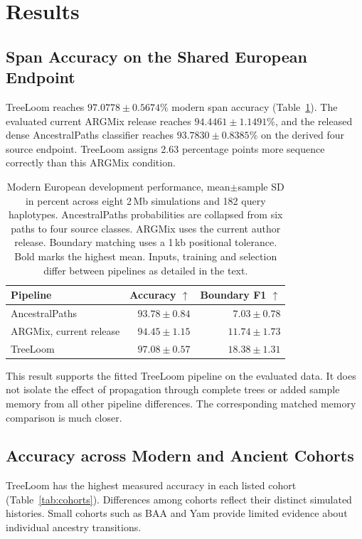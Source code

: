 \documentclass[letterpaper]{article}
\newcommand{\best}[1]{\mathbf{#1}}
\begin{document}
\section{Results}
\subsection{Span Accuracy on the Shared European Endpoint}
TreeLoom reaches $97.0778\pm0.5674\%$ modern span accuracy (Table~\ref{tab:pipeline}). The evaluated current ARGMix release reaches $94.4461\pm1.1491\%$, and the released dense AncestralPaths classifier reaches $93.7830\pm0.8385\%$ on the derived four source endpoint. TreeLoom assigns 2.63 percentage points more sequence correctly than this ARGMix condition.

\begin{table}[t]
\centering
\small
\begin{tabular}{@{}lrr@{}}
\toprule
Pipeline & Accuracy $\uparrow$ & Boundary F1 $\uparrow$\\
\midrule
AncestralPaths &$93.78\pm0.84$&$7.03\pm0.78$\\
ARGMix, current release &$94.45\pm1.15$&$11.74\pm1.73$\\
TreeLoom &$\best{97.08\pm0.57}$&$\best{18.38\pm1.31}$\\
\bottomrule
\end{tabular}
\caption{Modern European development performance, mean$\pm$sample SD in percent across eight 2\,Mb simulations and 182 query haplotypes. AncestralPaths probabilities are collapsed from six paths to four source classes. ARGMix uses the current author release. Boundary matching uses a 1\,kb positional tolerance. Bold marks the highest mean. Inputs, training and selection differ between pipelines as detailed in the text.}
\label{tab:pipeline}
\end{table}

This result supports the fitted TreeLoom pipeline on the evaluated data. It does not isolate the effect of propagation through complete trees or added sample memory from all other pipeline differences. The corresponding matched memory comparison is much closer.

\subsection{Accuracy across Modern and Ancient Cohorts}
TreeLoom has the highest measured accuracy in each listed cohort (Table~\ref{tab:cohorts}). Differences among cohorts reflect their distinct simulated histories. Small cohorts such as BAA and Yam provide limited evidence about individual ancestry transitions.
\end{document}
